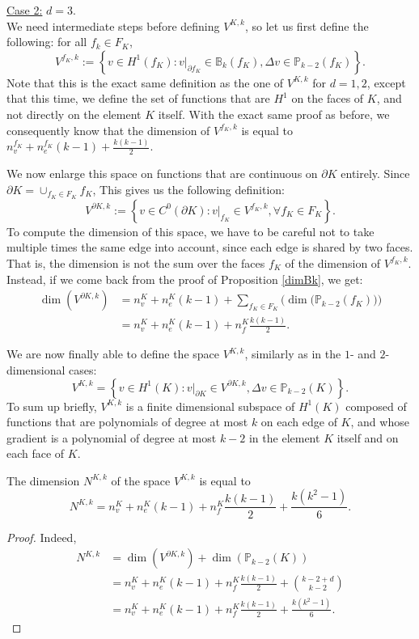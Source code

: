 \noindent \underline{Case 2:} $d=3$. \\
\noindent We need intermediate steps before defining $V^{K,k}$, so let us first define the following: for all $f_k\in F_K$, 
$$V^{f_K,k} := \left\{v\in H^1(f_K) : v|_{\partial f_K} \in \mathbb{B}_k(f_K), \Delta v\in \mathbb{P}_{k-2}(f_K)\right\}.$$
Note that this is the exact same definition as the one of $V^{K,k}$ for $d=1,2$, except that this time, we define the set of functions that are $H^1$ on the faces of $K$, and not directly on the element $K$ itself. With the exact same proof as before, we consequently know that the dimension of $V^{f_K,k}$ is equal to $n_v^{f_K} + n_e^{f_K}(k-1) + \frac{k(k-1)}{2}$. 

We now enlarge this space on functions that are continuous on $\partial K$ entirely. Since $\partial K = \cup_{f_K\in F_K}f_K$, This gives us the following definition:
$$V^{\partial K,k} := \left\{v\in C^0(\partial K) : v|_{f_K}\in V^{f_K,k}, \forall f_K\in F_K\right\}.$$
To compute the dimension of this space, we have to be careful not to take multiple times the same edge into account, since each edge is shared by two faces. That is, the dimension is not the sum over the faces $f_K$ of the dimension of $V^{f_K,k}$. Instead, if we come back from the proof of Proposition \ref{dimBk}, we get:
\begin{align*}
\dim\left(V^{\partial K, k}\right) &= n_v^K + n_e^K(k-1) + \sum_{f_K\in F_K}\Big(\dim\big(\mathbb{P}_{k-2} \left(f_K\right)\big)\Big)\\
&= n_v^K + n_e^K(k-1) + n_f^K\frac{k(k-1)}{2}.
\end{align*}

We are now finally able to define the space $V^{K,k}$, similarly as in the $1$- and $2$-dimensional cases:
$$V^{K,k} = \left\{v\in H^1(K):v|_{\partial K}\in V^{\partial K,k}, \Delta v\in \mathbb{P}_{k-2}(K)\right\}.$$
To sum up briefly, $V^{K,k}$ is a finite dimensional subspace of $H^1(K)$ composed of functions that are polynomials of degree at most $k$ on each edge of $K$, and whose gradient is a polynomial of degree at most $k-2$ in the element $K$ itself and on each face of $K$. 

\begin{proposition}\label{dimVKkd3}
The dimension $N^{K,k}$ of the space $V^{K,k}$ is equal to $$N^{K,k} = n_v^K + n_e^K(k-1) + n_f^K\frac{k(k-1)}{2} + \frac{k(k^2-1)}{6}.$$
\end{proposition}
\begin{proof}
Indeed, 
\begin{align*}
N^{K,k} &= \dim\left(V^{\partial K,k}\right) +  \dim\left(\mathbb{P}_{k-2}(K)\right)\\
&= n_v^K + n_e^K(k-1) + n_f^K\frac{k(k-1)}{2} + \binom{k-2+d}{k-2} \\
&= n_v^K + n_e^K(k-1) + n_f^K\frac{k(k-1)}{2} + \frac{k(k^2-1)}{6}.
\end{align*}
\end{proof}



